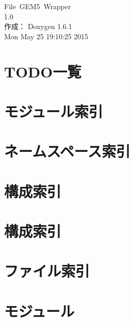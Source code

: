 \documentclass[a4paper]{book}
\begin{document}
\hypersetup{pageanchor=false}
\begin{titlepage}
\vspace*{7cm}
\begin{center}
{\Large File~GEM5~Wrapper \\[1ex]\large 1.0 }\\
\vspace*{1cm}
{\large 作成： Doxygen 1.6.1}\\
\vspace*{0.5cm}
{\small Mon May 25 19:10:25 2015}\\
\end{center}
\end{titlepage}
\clearemptydoublepage
{}
\tableofcontents
\clearemptydoublepage
{}
\hypersetup{pageanchor=true}
\chapter{TODO一覧}
\label{todo}
\hypertarget{todo}{}

\chapter{モジュール索引}

\chapter{ネームスペース索引}

\chapter{構成索引}

\chapter{構成索引}

\chapter{ファイル索引}

\chapter{モジュール}






\end{document}
